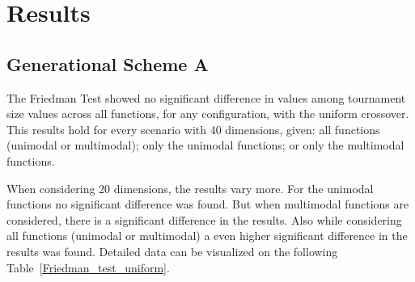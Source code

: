 \section{Results}\label{sec:results}

\subsection{Generational Scheme A}
The Friedman Test showed no significant difference in values among tournament size values across all functions, for any configuration, with the uniform crossover. This results hold for every scenario with 40 dimensions, given: all functions (unimodal or multimodal); only the unimodal functions; or only the multimodal functions. 

When considering 20 dimensions, the results vary more. For the unimodal functions no significant difference was found. But when multimodal functions are considered, there is a significant difference in the results. Also while considering all functions (unimodal or multimodal) a even higher significant difference in the results was found. Detailed data can be visualized on the following Table~\ref{Friedman_test_uniform}. 


